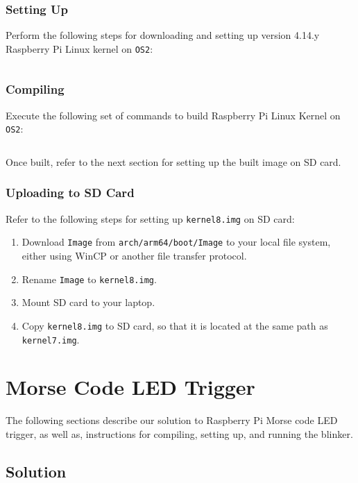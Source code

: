 \documentclass[onecolumn, draftclsnofoot, 10pt, compsoc]{IEEEtran}
\begin{document}
\subsubsection{Setting Up}
Perform the following steps for downloading and setting up version 4.14.y Raspberry Pi Linux kernel on \texttt{OS2}:
\inputminted[breaklines]{bash}{cs1.sh}

\subsubsection{Compiling}
Execute the following set of commands to build Raspberry Pi Linux Kernel on \texttt{OS2}:
\inputminted[breaklines]{bash}{cs3.sh}
Once built, refer to the next section for setting up the built image on SD card.

\subsubsection{Uploading to SD Card} \label{ker_upload}
Refer to the following steps for setting up \texttt{kernel8.img} on SD card:
\begin{enumerate}
\item Download \texttt{Image} from \texttt{arch/arm64/boot/Image} to your local file system, either using WinCP or another file transfer protocol.
\item Rename \texttt{Image} to \texttt{kernel8.img}.
\item Mount SD card to your laptop.
\item Copy \texttt{kernel8.img} to SD card, so that it is located at the same path as \texttt{kernel7.img}.
\end{enumerate}


\section{Morse Code LED Trigger}
The following sections describe our solution to Raspberry Pi Morse code LED trigger, as well as, instructions for compiling, setting up, and running the blinker.

\subsection{Solution}
\end{document}
